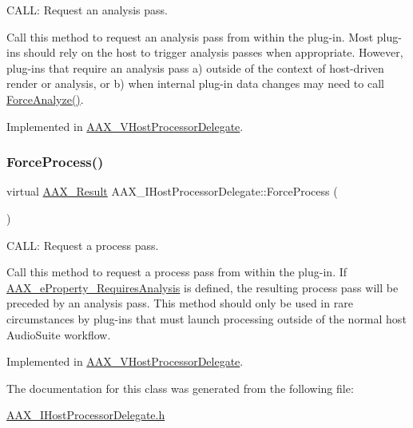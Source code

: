 C\+A\+LL\+: Request an analysis pass. 

Call this method to request an analysis pass from within the plug-\/in. Most plug-\/ins should rely on the host to trigger analysis passes when appropriate. However, plug-\/ins that require an analysis pass a) outside of the context of host-\/driven render or analysis, or b) when internal plug-\/in data changes may need to call {\ttfamily \mbox{\hyperlink{a01837_a8ab521c8f0902707a8e8d67d7886d4f4}{Force\+Analyze()}}}. 

Implemented in \mbox{\hyperlink{a01921_aeb3eb18f1c9562a31173d600dad9b251}{A\+A\+X\+\_\+\+V\+Host\+Processor\+Delegate}}.

\mbox{\label{a01837_a09793675802a25886bc050cee4b9f843}} 
\subsubsection{\texorpdfstring{ForceProcess()}{ForceProcess()}}
{\footnotesize\ttfamily virtual \mbox{\hyperlink{a00392_a4d8f69a697df7f70c3a8e9b8ee130d2f}{A\+A\+X\+\_\+\+Result}} A\+A\+X\+\_\+\+I\+Host\+Processor\+Delegate\+::\+Force\+Process (\begin{DoxyParamCaption}{ }\end{DoxyParamCaption})\hspace{0.3cm}{\ttfamily [pure virtual]}}



C\+A\+LL\+: Request a process pass. 

Call this method to request a process pass from within the plug-\/in. If \mbox{\hyperlink{a00662_a13e384f22825afd3db6d68395b79ce0da925c49bb79454b33bf1d5f4cb09d373f}{A\+A\+X\+\_\+e\+Property\+\_\+\+Requires\+Analysis}} is defined, the resulting process pass will be preceded by an analysis pass. This method should only be used in rare circumstances by plug-\/ins that must launch processing outside of the normal host Audio\+Suite workflow. 

Implemented in \mbox{\hyperlink{a01921_a5e72699c0dafb133a2dfabf63ba8f56a}{A\+A\+X\+\_\+\+V\+Host\+Processor\+Delegate}}.



The documentation for this class was generated from the following file\+:\begin{DoxyCompactItemize}
\item 
\mbox{\hyperlink{a00608}{A\+A\+X\+\_\+\+I\+Host\+Processor\+Delegate.\+h}}\end{DoxyCompactItemize}
